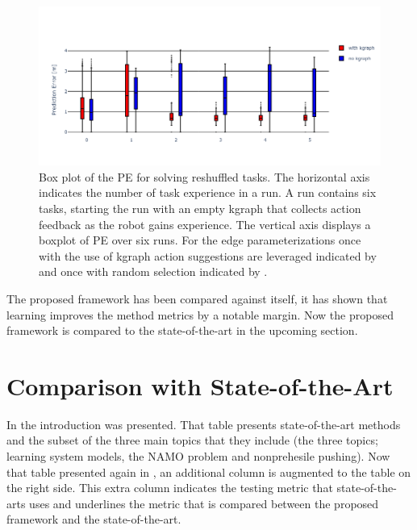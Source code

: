 \begin{figure}[H]
    \centering
    \includegraphics[width=\textwidth]{figures/results/random_push_pe_vs}
    \caption{Box plot of the \acl{PE} for solving reshuffled tasks. The horizontal axis indicates the number of task experience in a run. A run contains six tasks, starting the run with an empty \ac{kgraph} that collects action feedback as the robot gains experience. The vertical axis displays a boxplot of \acl{PE} over six runs. For the edge parameterizations once with the use of \ac{kgraph} action suggestions are leveraged indicated by  and once with random selection indicated by .}%
    \label{fig:random_push_pe_vs}
\end{figure}

The proposed framework has been compared against itself, it has shown that learning improves the method metrics by a notable margin. Now the proposed framework is compared to the state-of-the-art in the upcoming section.\bs
{}

\section{Comparison with State-of-the-Art}%
\label{sec:compare_with_related_papers}
In the introduction  was presented. That table presents state-of-the-art methods and the subset of the three main topics that they include (the three topics; learning system models, the \ac{NAMO} problem and nonprehesile pushing). Now that table presented again in , an additional column is augmented to the table on the right side. This extra column indicates the testing metric that state-of-the-arts uses and underlines the metric that is compared between the proposed framework and the state-of-the-art.\bs

